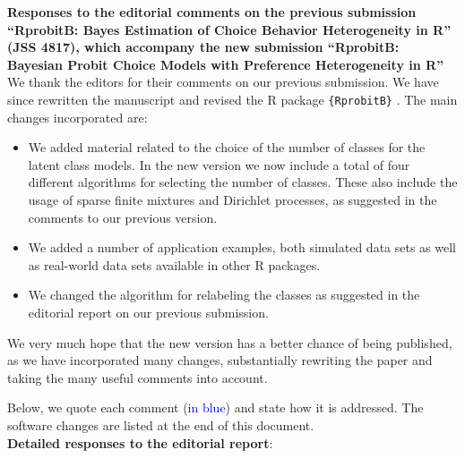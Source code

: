\documentclass[12pt,a4paper]{article}
\newcommand{\proglang}[1]{\textsf{#1}}
\begin{document}
\noindent \textbf{Responses to the editorial comments on the previous submission
``RprobitB: Bayes Estimation of Choice Behavior Heterogeneity in R'' (JSS 4817),
which accompany the new submission ``RprobitB: Bayesian Probit Choice Models
with Preference Heterogeneity in R''}\\

We thank the editors for their comments on our previous submission. We have
since rewritten the manuscript and revised the \proglang{R} package
\texttt{\{RprobitB\}} \parencite{Oelschlaeger2026d}. The main changes
incorporated are:

\begin{itemize}
    \item We added material related to the choice of the number of classes
    for the latent class models. In the new version we now include a total of
    four different algorithms for selecting the number of classes. These also
    include the usage of sparse finite mixtures and Dirichlet processes, as
    suggested in the comments to our previous version.
    \item We added a number of application examples, both simulated data sets
    as well as real-world data sets available in other \proglang{R} packages.
    \item We changed the algorithm for relabeling the classes as suggested in
    the editorial report on our previous submission.
\end{itemize}

We very much hope that the new version has a better chance of being
published, as we have incorporated many changes, substantially rewriting the
paper and taking the many useful comments into account.

Below, we quote each comment (\textcolor{blue}{in blue}) and state how it is
addressed. The software changes are listed at the end of this document.
\\

\noindent \textbf{Detailed responses to the editorial report}:
\end{document}
